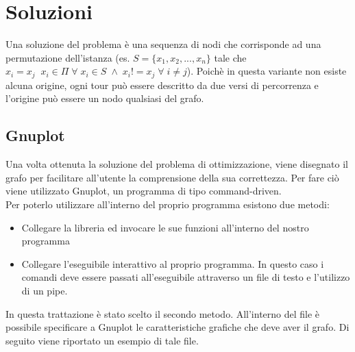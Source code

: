 \section{Soluzioni}
Una soluzione del problema è una sequenza di nodi che corrisponde ad una permutazione dell'istanza (es. $S = \{x_1,x_2,...,x_n\}$ tale che $x_i=x_j\;\;x_i \in \Pi\;\forall\;x_i\in S\;\wedge\; x_i!=x_j\;\forall\;i\neq j$). Poichè in questa variante non esiste alcuna origine, ogni tour può essere descritto da due versi di percorrenza e l'origine può essere un nodo qualsiasi del grafo.
\subsection{Gnuplot}\label{gnuplot}
Una volta ottenuta la soluzione del problema di ottimizzazione, viene disegnato il grafo per facilitare all'utente la comprensione della sua correttezza. Per fare ciò viene utilizzato Gnuplot, un programma di tipo command-driven.\\
Per poterlo utilizzare all'interno del proprio programma esistono due metodi:
\begin{itemize}
\item{Collegare la libreria ed invocare le sue funzioni all'interno del nostro programma}
\item{Collegare l'eseguibile interattivo al proprio programma. In questo caso i comandi deve essere passati all'eseguibile attraverso un file di testo e l'utilizzo di un pipe.}\\
\end{itemize}
In questa trattazione è stato scelto il secondo metodo. All'interno del file è possibile specificare a Gnuplot le caratteristiche grafiche che deve aver il grafo. Di seguito viene riportato un esempio di tale file.\\



